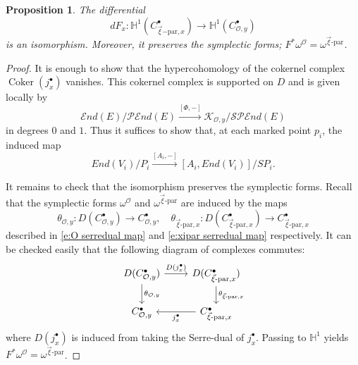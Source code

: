 \documentclass[11pt]{amsart}
\theoremstyle{plain}
\newtheorem{proposition}[theorem]{Proposition}
\theoremstyle{definition}
\theoremstyle{remark}
\newcommand{\End}{\mathcal E nd}
\newcommand{\Coker}{\operatorname{Coker}}
\newcommand{\HH}{\mathbb H}
\newcommand{\PEnd}{\mathcal P\!\End}
\newcommand{\SPEnd}{\mathcal{SP}\!\End}
\newcommand{\cO}{\mathcal O}
\def\bb{\mathbb}
\def\vxi{\vec{\xi}}
\begin{document}
\begin{proposition}\label{prop:dFx-isomorphism}
The differential
\[
dF_x:\HH^1(C_{\vxi\mathrm{-par},x}^\bullet)\longrightarrow
\HH^1(C_{\cO,y}^\bullet)
\]
is an isomorphism. Moreover, it preserves the symplectic forms; $F^*\omega^{\cO}=\omega^{\vxi\text{-par}}$.
\end{proposition}

\begin{proof}
It is enough to show that the hypercohomology of the cokernel complex
$\Coker(j_x^\bullet)$ vanishes. This cokernel complex is supported on $D$ and is
given locally by
\[
\End(E)/\PEnd(E)
\xrightarrow{[\Phi,-]}
\mathcal K_{\cO,y}/\SPEnd(E)
\]
in degrees $0$ and $1$. Thus it suffices to show that, at each marked point
$p_i$, the induced map
\[ End(V_i)/P_i \xrightarrow{[A_i,-]} [A_i,End(V_i)]/SP_i. \]

It remains to check that the isomorphism preserves the symplectic forms. Recall that the symplectic forms $\omega^{\cO}$ and $\omega^{\vxi\text{-par}}$ are induced by the maps
\[\theta_{\cO,y}:D(C_{\cO,y}^\bullet)\to C_{\cO,y}^\bullet, \quad \theta_{\vxi\text{-par},x}:D(C_{\vxi\text{-par},x}^\bullet)\to C_{\vxi\text{-par},x}^\bullet\]
described in \eqref{e:O serredual map} and \eqref{e:xipar serredual map} respectively. It can be checked easily that the following diagram of complexes commutes:
\[
\begin{tikzcd}
    D(C_{\cO,y}^\bullet) \arrow[r, "D(j_x^\bullet)"] \arrow[d,"\theta_{\cO,y}"] & D(C_{\vxi\text{-par},x}^\bullet) \arrow[d, "\theta_{\vxi\text{-par},x}"] \\
    C_{\cO,y}^\bullet& C_{\vxi\text{-par},x}^\bullet \arrow[l, "j_x^\bullet"]
\end{tikzcd}
\]
where $D(j_x^\bullet)$ is induced from taking the Serre-dual of $j_x^{\bullet}$. Passing to $\bb{H}^1$ yields $F^*\omega^{\cO}=\omega^{\vxi\text{-par}}$. 

\end{proof}
\end{document}
